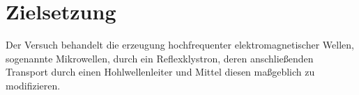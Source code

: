 \section{Zielsetzung}
Der Versuch behandelt die erzeugung hochfrequenter elektromagnetischer Wellen, 
sogenannte Mikrowellen, durch ein Reflexklystron, deren anschließenden Transport durch einen Hohlwellenleiter und Mittel diesen maßgeblich zu modifizieren.